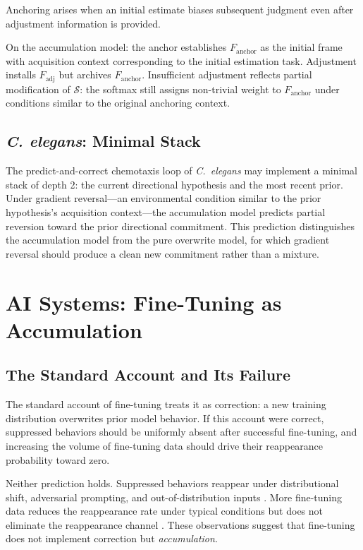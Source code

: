 \documentclass[12pt]{article}
\begin{document}
Anchoring \cite{epley2001} arises when an initial estimate biases
subsequent judgment even after adjustment information is provided.

On the accumulation model: the anchor establishes $F_\mathrm{anchor}$
as the initial frame with acquisition context corresponding to the
initial estimation task.
Adjustment installs $F_\mathrm{adj}$ but archives $F_\mathrm{anchor}$.
Insufficient adjustment reflects partial modification of
$\mathcal{S}$: the softmax still assigns non-trivial weight to
$F_\mathrm{anchor}$ under conditions similar to the original
anchoring context.

\subsection{\textit{C. elegans}: Minimal Stack}

The predict-and-correct chemotaxis loop of \textit{C.~elegans}
\cite{bargmann2006} may implement a minimal stack of depth 2:
the current directional hypothesis and the most recent prior.
Under gradient reversal---an environmental condition similar to
the prior hypothesis's acquisition context---the accumulation
model predicts partial reversion toward the prior directional
commitment.
This prediction distinguishes the accumulation model from the
pure overwrite model, for which gradient reversal should produce
a clean new commitment rather than a mixture.

\section{AI Systems: Fine-Tuning as Accumulation}

\subsection{The Standard Account and Its Failure}

The standard account of fine-tuning treats it as correction:
a new training distribution overwrites prior model behavior.
If this account were correct, suppressed behaviors should be
uniformly absent after successful fine-tuning, and increasing
the volume of fine-tuning data should drive their reappearance
probability toward zero.

Neither prediction holds.
Suppressed behaviors reappear under distributional shift,
adversarial prompting, and out-of-distribution inputs
\cite{wei2023jailbroken, qi2023fine, perez2022ignore}.
More fine-tuning data reduces the reappearance rate under
typical conditions but does not eliminate the reappearance
channel \cite{yang2023shadow}.
These observations suggest that fine-tuning does not implement
correction but \emph{accumulation}.
\end{document}

